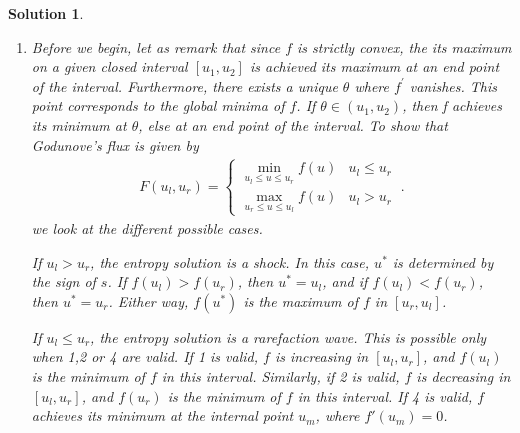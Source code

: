 \documentclass[10pt,letterpaper]{article}
\newcommand{\frb}[1]{ \left(  {#1} \right) }
\theoremstyle{break}
\newtheorem{mysolution}{Solution}
\newenvironment{solution}{\begin{mysolution}}{\end{mysolution}}
\begin{document}
\begin{solution}
\begin{enumerate}
        Next suppose $f'(u_l), f'(u_r)\le 0$.
        By similar arguments we get $u^*=u_r$.

        If $f'(u_l) \ge 0\ge f'(u_r)$, the entropy solution is a shock, and the intermediate state $u^*$ is determined by the sign of the shock speed \eqref{RHJumpCond}.

        Finally suppose $f'(u_l) < 0 < f'(u_r)$.
        Then, the entropy solution is a rarefaction wave.
        This time $x=0$ falls inside the rarefaction fan.
        As we have seen in a previous exercise (see exercise set 3), the rarefaction solution is given by $u(x,t)=w\frb{x/t}$, where $w$ is the solution to $f'\frb{w\frb{\xi}}=\xi$.
        Since we are interested in the value of $u$ at $x=0$, we have $u^*=w\frb{0}$.

        \item
        Before we begin, let as remark that since $f$ is strictly convex, the its maximum on a given closed interval $[u_1,u_2]$ is achieved its maximum at an end point of the interval. Furthermore, there exists a unique $\theta$ where $f^\prime$ vanishes. This point corresponds to the global minima of $f$. If $\theta \in (u_1,u_2)$, then f achieves its minimum at $\theta$, else at an end point of the interval.
        To show that Godunove's flux is given by
        \begin{gather} \label{GodFlx}
            F(u_l,u_r)=\begin{cases}
                    \displaystyle
                    \min_{u_l\le u\le u_r} f(u) & u_l\le u_r \\[1em]
                    \displaystyle
                    \max_{u_r\le u\le u_l} f(u) & u_l> u_r 
                \end{cases}\ .
        \end{gather}
        we look at the different possible cases.

        If $u_l>u_r$, the entropy solution is a shock.
        In this case, $u^*$ is determined by the sign of $s$.
        If $f(u_l)>f(u_r)$, then $u^*=u_l$, and if $f(u_l)<f(u_r)$, then $u^*=u_r$.
        Either way, $f\frb{u^*}$ is the maximum of $f$ in $[u_r,u_l]$.

        If $u_l\le u_r$, the entropy solution is a rarefaction wave.
        This is possible only when 1,2 or 4 are valid.
        If 1 is valid, $f$ is increasing in $[u_l,u_r]$, and $f(u_l)$ is the minimum of $f$ in this interval.
        Similarly, if 2 is valid, $f$ is decreasing in $[u_l,u_r]$, and $f(u_r)$ is the minimum of $f$ in this interval.
        If 4 is valid, $f$ achieves its minimum at the internal point $u_m$, where $f'\frb{u_m}=0$.



\end{enumerate}
\end{solution}
\end{document}
